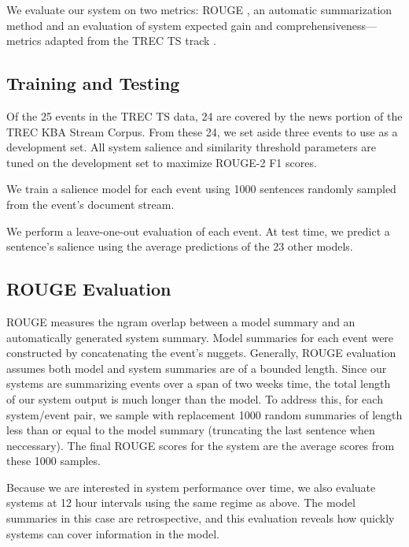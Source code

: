 We evaluate our system on two metrics: ROUGE \cite{lin2004rouge}, an automatic
summarization method and an evaluation of system expected gain 
and comprehensiveness---metrics adapted 
from the TREC TS track \cite{aslam2013trec}.


\subsection{Training and Testing}

Of the 25 events in the TREC TS data, 24 are covered by the news portion 
of the TREC KBA Stream Corpus.
From these 24, we set aside three events to use as a development set.
All system salience and similarity threshold parameters are tuned on the
development set to maximize ROUGE-2 F1 scores.

We train a salience model for each event using 1000 sentences randomly sampled
from the event's document stream. 

We perform a leave-one-out evaluation of each event.
At test time, we predict a sentence's salience using the average predictions
of the 23 other models.   

\subsection{ROUGE Evaluation}

ROUGE measures the ngram overlap between a model summary 
and an automatically generated system summary. 
Model summaries for each event were constructed by concatenating the event's 
nuggets. 
Generally, ROUGE evaluation assumes both model and system summaries
are of a bounded length. Since our systems are summarizing events over a span
of two weeks time, the total length of our system output is much longer than
the model. To address this, for each system/event pair, we sample with replacement
1000 random summaries of length less than or equal to the model summary 
(truncating the last sentence when neccessary). The final ROUGE scores for the 
system are the average scores from these 1000 samples.

Because we are interested in system performance over time, we also evaluate 
systems at 12 hour intervals using the same regime as above. 
The model summaries in this case are retrospective, 
and this evaluation reveals how quickly systems can cover  information in the model.


